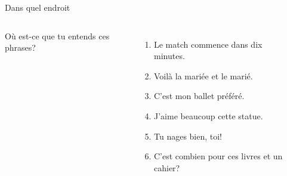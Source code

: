 \begin{frame}{Dans quel endroit }
  \begin{columns}
      Où est-ce que tu entends ces phrases? \\
      \begin{enumerate}
        \item Le match commence dans dix minutes.
        \item<3-> Voilà la mariée et le marié.
        \item<5-> C'est mon ballet préféré.
        \item<7-> J'aime beaucoup cette statue.
        \item<9-> Tu nages bien, toi!
        \item<11-> C'est combien pour ces livres et un cahier?
      \end{enumerate}
      \begin{minipage}[c][0.6\textheight]{\linewidth}
        \begin{center}
        \end{center}
      \end{minipage}
  \end{columns}
\end{frame}